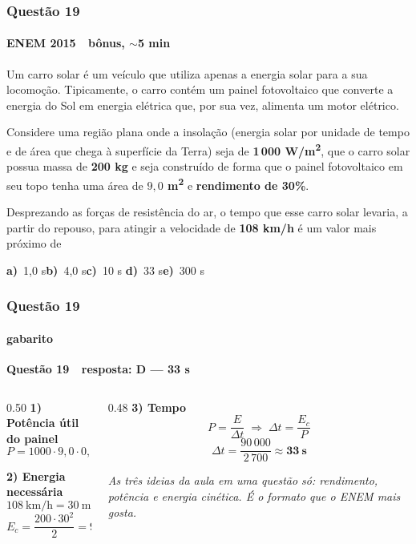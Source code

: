 \documentclass[aspectratio=169,12pt]{beamer}
\newcommand{\alternativascurtas}[5]{%
  \par\vspace{0.7em}%
  \noindent\textbf{a)}~#1\hfill\textbf{b)}~#2\hfill\textbf{c)}~#3%
  \hfill\textbf{d)}~#4\hfill\textbf{e)}~#5\par}
\newcommand{\resposta}[2]{%
  \par\vspace{0.2em}
  {\Large\bfseries\color{vinho}Quest\~ao #1 \,\textemdash\, resposta: #2}
  \par\vspace{0.6em}}
\begin{document}
\begin{frame}
\frametitle{Quest\~ao 19}
\framesubtitle{ENEM 2015 \,\textperiodcentered\, b\^onus, $\sim$5 min}

\small
Um carro solar \'e um ve\'iculo que utiliza apenas a energia solar para
a sua locomo\c{c}\~ao. Tipicamente, o carro cont\'em um painel
fotovoltaico que converte a energia do Sol em energia el\'etrica que,
por sua vez, alimenta um motor el\'etrico.

\vspace{0.3em}
Considere uma regi\~ao plana onde a insola\c{c}\~ao (energia solar por
unidade de tempo e de \'area que chega \`a superf\'icie da Terra) seja
de \textbf{1\,000 W/m\textsuperscript{2}}, que o carro solar possua
massa de \textbf{200 kg} e seja constru\'ido de forma que o painel
fotovoltaico em seu topo tenha uma \'area de
\textbf{$9{,}0$ m\textsuperscript{2}} e \textbf{rendimento de 30\%}.

\vspace{0.3em}
Desprezando as for\c{c}as de resist\^encia do ar, o tempo que esse
carro solar levaria, a partir do repouso, para atingir a velocidade de
\textbf{108 km/h} \'e um valor mais pr\'oximo de

\alternativascurtas{1,0 s}{4,0 s}{10 s}{33 s}{300 s}
\end{frame}

\begin{frame}
\frametitle{Quest\~ao 19}
\framesubtitle{gabarito}
\resposta{19}{D --- 33 s}

\begin{columns}[T]
\begin{column}{0.50\textwidth}
\textbf{1) Pot\^encia \'util do painel}
\[ P = 1000\cdot 9{,}0\cdot 0{,}30 = 2\,700\ \text{W} \]

\textbf{2) Energia necess\'aria}
\[ 108\ \text{km/h} = 30\ \text{m/s} \]
\[ E_c = \frac{200\cdot 30^2}{2} = 90\,000\ \text{J} \]
\end{column}
\begin{column}{0.48\textwidth}
\textbf{3) Tempo}
\[ P = \frac{E}{\Delta t} \;\Longrightarrow\;
   \Delta t = \frac{E_c}{P} \]
\[ \Delta t = \frac{90\,000}{2\,700} \approx \mathbf{33\ s} \]

\vspace{0.4em}
{\color{grafite}\itshape As tr\^es ideias da aula em uma quest\~ao
s\'o: rendimento, pot\^encia e energia cin\'etica. \'E o formato que o
ENEM mais gosta.}
\end{column}
\end{columns}
\end{frame}
\end{document}

